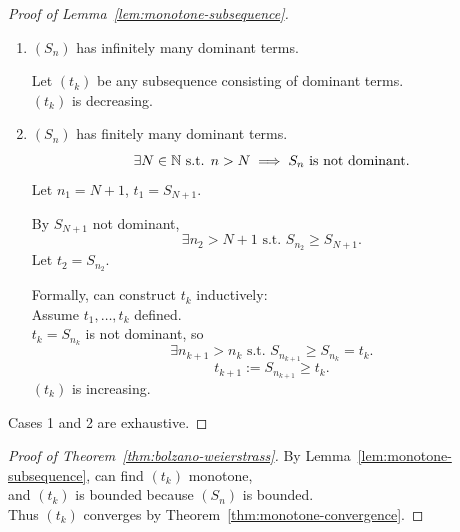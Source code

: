 \begin{proof}[Proof of Lemma~\ref{lem:monotone-subsequence}]\proofheadingbreak
  \begin{enumerate}[label=Case \arabic*., proofparts]
    \item $(S_n)$ has infinitely many dominant terms.
          \begin{center}
          \end{center}
          Let $(t_k)$ be any subsequence consisting of dominant terms.\\
          $(t_k)$ is decreasing.

    \item $(S_n)$ has finitely many dominant terms.
          \[
            \exists N\in\mathbb{N}\text{ s.t. }n>N\implies S_n\text{ is not dominant}.
          \]
           Let $n_1=N+1$, $t_1=S_{N+1}$.

          By $S_{N+1}$ not dominant,
          \[
            \exists n_2>N+1\text{ s.t. }S_{n_2}\ge S_{N+1}.
          \]
          Let $t_2=S_{n_2}$.

           Formally, can construct $t_k$ inductively:\\
          Assume $t_1,\ldots,t_k$ defined.\\
          $t_k=S_{n_k}$ is not dominant, so
          \[
            \exists n_{k+1}>n_k\text{ s.t. }S_{n_{k+1}}\ge S_{n_k}=t_k.
          \]
          \[
            t_{k+1}:=S_{n_{k+1}}\ge t_k.
          \]
          $(t_k)$ is increasing.
  \end{enumerate}
  Cases 1 and 2 are exhaustive.
\end{proof}

\begin{proof}[Proof of Theorem~\ref{thm:bolzano-weierstrass}]
  By Lemma~\ref{lem:monotone-subsequence}, can find $(t_k)$ monotone,\\
  and $(t_k)$ is bounded because $(S_n)$ is bounded.\\
  Thus $(t_k)$ converges by Theorem~\ref{thm:monotone-convergence}.
\end{proof}

